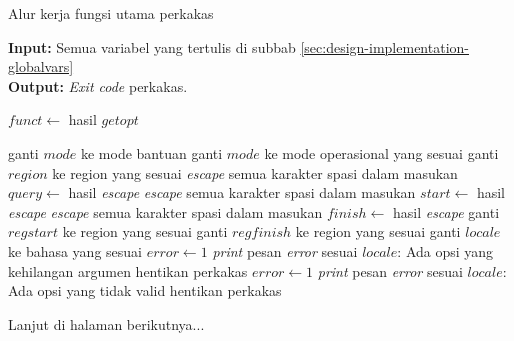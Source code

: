 \begin{algorithm}[h]
	\caption{\textendash\xspace Alur kerja fungsi utama perkakas}
	\label{alg:design-main}
	\vspace{-0.6\baselineskip}
	\begin{flushleft}
		\textbf{Input:} Semua variabel yang tertulis di subbab \ref{sec:design-implementation-globalvars} \\
		\textbf{Output:} \textit{Exit code} perkakas. \\
	\end{flushleft}
	\vspace{-1.05\baselineskip}
	\begin{algorithmic}
		 
			\State $funct \gets$ hasil $getopt$
			
					 
						\State ganti $mode$ ke mode bantuan
					\EndIf
				\EndCase
						\State ganti $mode$ ke mode operasional yang sesuai
					\EndIf
				\EndCase
					\State ganti $region$ ke region yang sesuai
				\EndCase
						\State \textit{escape} semua karakter spasi dalam masukan
						\State $query \gets$ hasil \textit{escape}
					\EndIf
				\EndCase
						\State \textit{escape} semua karakter spasi dalam masukan
						\State $start \gets$ hasil \textit{escape}
					\EndIf
				\EndCase
						\State \textit{escape} semua karakter spasi dalam masukan
						\State $finish \gets$ hasil \textit{escape}
					\EndIf
				\EndCase
					\State ganti $regstart$ ke region yang sesuai
				\EndCase
					\State ganti $regfinish$ ke region yang sesuai
				\EndCase
					\State ganti $locale$ ke bahasa yang sesuai
				\EndCase
				\Case{\textquotesingle :\textquotesingle}
					\State $error \gets 1$
					\State \textit{print} pesan \textit{error} sesuai $locale$: Ada opsi yang kehilangan argumen
					\State hentikan perkakas
				\EndCase
					\State $error \gets 1$
					\State \textit{print} pesan \textit{error} sesuai $locale$: Ada opsi yang tidak valid
					\State hentikan perkakas
				\EndCase
			\EndSwitch
		\EndWhile
	\end{algorithmic}
	\begin{flushright}
		Lanjut di halaman berikutnya...
	\end{flushright}
	\vspace{-0.95\baselineskip}
\end{algorithm}

